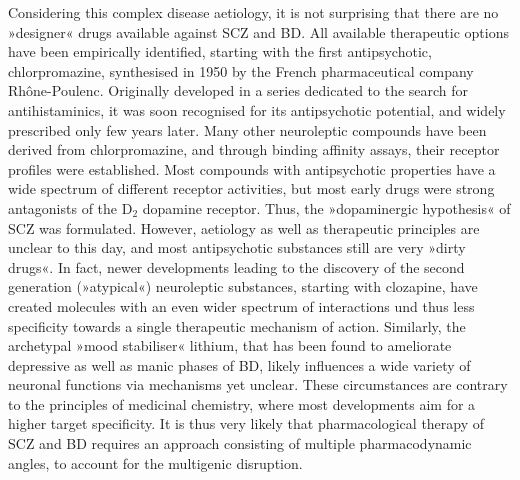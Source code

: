 Considering this complex disease aetiology, it is not surprising that there are no »designer« drugs available against SCZ and BD. All available therapeutic options have been empirically identified, starting with the first antipsychotic, chlorpromazine, synthesised in 1950 by the French pharmaceutical company Rhône-Poulenc. Originally developed in a series dedicated to the search for antihistaminics, it was soon recognised for its antipsychotic potential, and widely prescribed only few years later. Many other neuroleptic compounds have been derived from chlorpromazine, and through binding affinity assays, their receptor profiles were established. Most compounds with antipsychotic properties have a wide spectrum of different receptor activities, but most early drugs were strong antagonists of the D$_2$ dopamine receptor. Thus, the »dopaminergic hypothesis« of SCZ was formulated. However, aetiology as well as therapeutic principles are unclear to this day, and most antipsychotic substances still are very »dirty drugs«. In fact, newer developments leading to the discovery of the second generation (»atypical«) neuroleptic substances, starting with clozapine, have created molecules with an even wider spectrum of interactions und thus less specificity towards a single therapeutic mechanism of action. Similarly, the archetypal »mood stabiliser« lithium, that has been found to ameliorate depressive as well as manic phases of BD, likely influences a wide variety of neuronal functions via mechanisms yet unclear.\cite{Malhi2013} These circumstances are contrary to the principles of medicinal chemistry, where most developments aim for a higher target specificity. It is thus very likely that pharmacological therapy of SCZ and BD requires an approach consisting of multiple pharmacodynamic angles, to account for the multigenic disruption.

